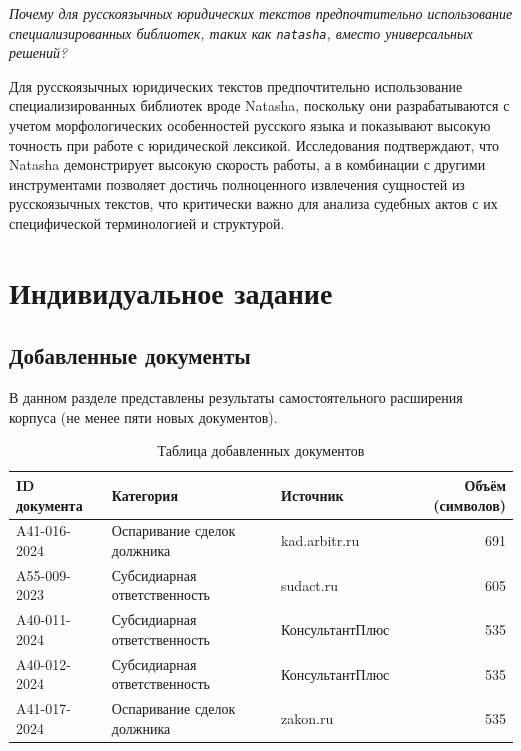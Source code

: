 \documentclass[12pt, a4paper]{report}
\newcommand{\placeholder}[2][Вставьте результат]{%
  \begin{tcolorbox}[placeholderbox, title={#2}]
    #1
  \end{tcolorbox}%
  \vspace{4pt}%
}
\begin{document}
\textit{Почему для русскоязычных юридических текстов предпочтительно использование
специализированных библиотек, таких как \texttt{natasha}, вместо универсальных
решений?}

\placeholder[Для русскоязычных юридических текстов предпочтительно использование специализированных библиотек вроде Natasha, поскольку они разрабатываются с учетом морфологических особенностей русского языка и показывают высокую точность при работе с юридической лексикой. Исследования подтверждают, что Natasha демонстрирует высокую скорость работы, а в комбинации с другими инструментами позволяет достичь полноценного извлечения сущностей из русскоязычных текстов, что критически важно для анализа судебных актов с их специфической терминологией и структурой.]{Ответ на вопрос 4}

\chapter{Индивидуальное задание}

\section{Добавленные документы}

В данном разделе представлены результаты самостоятельного расширения корпуса
(не менее пяти новых документов).


\begin{table}[h]
  \centering
  \caption{Таблица добавленных документов}
  \label{table:classification}
  \begin{tabular}{l l l r}
  \toprule
  \textbf{ID документа} & 
  \textbf{Категория} & 
  \textbf{Источник} & 
  \textbf{Объём (символов)} \\
  \midrule
  A41-016-2024 & Оспаривание сделок должника & kad.arbitr.ru & 691 \\
  A55-009-2023 & Субсидиарная ответственность & sudact.ru & 605 \\
  A40-011-2024 & Субсидиарная ответственность & КонсультантПлюс & 535 \\
  A40-012-2024 & Субсидиарная ответственность & КонсультантПлюс & 535 \\
  A41-017-2024 & Оспаривание сделок должника & zakon.ru & 535 \\
  \midrule
  \end{tabular}
  \end{table}
\end{document}

